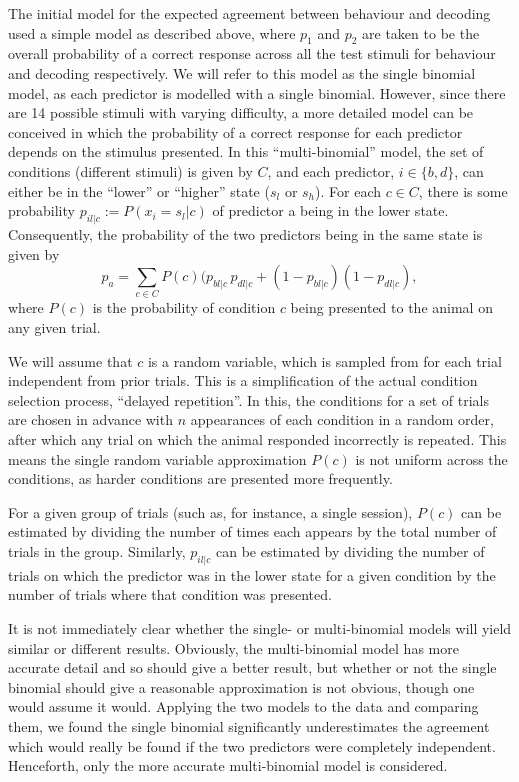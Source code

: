 The initial model for the expected agreement between behaviour and decoding used a simple model as described above, where $p_1$ and $p_2$ are taken to be the overall probability of a correct response across all the test stimuli for behaviour and decoding respectively.
We will refer to this model as the single binomial model, as each predictor is modelled with a single binomial.
However, since there are 14 possible stimuli with varying difficulty, a more detailed model can be conceived in which the probability of a correct response for each predictor depends on the stimulus presented.
In this ``multi-binomial'' model, the set of conditions (different stimuli) is given by $C$, and each predictor, $i\in\{b,d\}$, can either be in the ``lower'' or ``higher'' state ($s_l$ or $s_h$).
For each $c\in C$, there is some probability $p_{il|c} := P(x_i=s_l|c)$ of predictor a being in the lower state.
Consequently, the probability of the two predictors being in the same state is given by
\begin{equation}
p_a = \sum_{c\in C} P(c) (p_{bl|c} \, p_{dl|c} + (1-p_{bl|c}) (1-p_{dl|c})
,\end{equation}
where $P(c)$ is the probability of condition $c$ being presented to the animal on any given trial.

We will assume that $c$ is a random variable, which is sampled from for each trial independent from prior trials.
This is a simplification of the actual condition selection process, ``delayed repetition''.
In this, the conditions for a set of trials are chosen in advance with $n$ appearances of each condition in a random order, after which any trial on which the animal responded incorrectly is repeated.
This means the single random variable approximation $P(c)$ is not uniform across the conditions, as harder conditions are presented more frequently.

For a given group of trials (such as, for instance, a single session), $P(c)$ can be estimated by dividing the number of times each appears by the total number of trials in the group.
Similarly, $p_{il|c}$ can be estimated by dividing the number of trials on which the predictor was in the lower state for a given condition by the number of trials where that condition was presented.

It is not immediately clear whether the single- or multi-binomial models will yield similar or different results.
Obviously, the multi-binomial model has more accurate detail and so should give a better result, but whether or not the single binomial should give a reasonable approximation is not obvious, though one would assume it would.
Applying the two models to the data and comparing them, we found the single binomial significantly underestimates the agreement which would really be found if the two predictors were completely independent.
Henceforth, only the more accurate multi-binomial model is considered.

